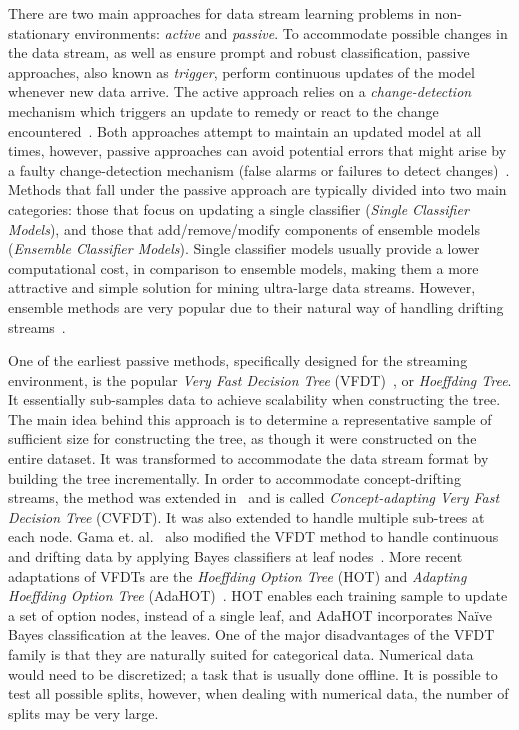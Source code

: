 \documentclass[reqno]{vcuthesis}
\numberwithin{equation}{chapter}
\begin{document}
There are two main approaches for data stream learning problems in non-stationary environments: \textit{active} and \textit{passive}. To accommodate possible changes in the data stream, as well as ensure prompt and robust classification, passive approaches, also known as \textit{trigger}, perform continuous updates of the model whenever new data arrive. The active approach relies on a \textit{change-detection} mechanism which triggers an update to remedy or react to the change encountered~\cite{krawczyk2015one}. Both approaches attempt to maintain an updated model at all times, however, passive approaches can avoid potential errors that might arise by a faulty change-detection mechanism (false alarms or failures to detect changes)~\cite{ditzler2015learning}. Methods that fall under the passive approach are typically divided into two main categories: those that focus on updating a single classifier (\textit{Single Classifier Models}), and those that add/remove/modify components of ensemble models (\textit{Ensemble Classifier Models}). Single classifier models usually provide a lower computational cost, in comparison to ensemble models, making them a more attractive and simple solution for mining ultra-large data streams. However, ensemble methods are very popular due to their natural way of handling drifting streams~\cite{krawczyk2017ensemble}. 

One of the earliest passive methods, specifically designed for the streaming environment, is the popular \textit{Very Fast Decision Tree} (VFDT)~\cite{domingos2000mining}, or \textit{Hoeffding Tree}. It essentially sub-samples data to achieve scalability when constructing the tree. The main idea behind this approach is to determine a representative sample of sufficient size for constructing the tree, as though it were constructed on the entire dataset. It was transformed to accommodate the data stream format by building the tree incrementally. In order to accommodate concept-drifting streams, the method was extended in~\cite{hulten2001mining} and is called \textit{Concept-adapting Very Fast Decision Tree} (CVFDT). It was also extended to handle multiple sub-trees at each node. Gama et. al.~\cite{gama2006decision} also modified the VFDT method to handle continuous and drifting data by applying Bayes classifiers at leaf nodes~\cite{aggarwal}. More recent adaptations of VFDTs are the \textit{Hoeffding Option Tree} (HOT) and \textit{Adapting Hoeffding Option Tree} (AdaHOT)~\cite{pfahringer2007new}. HOT enables each training sample to update a set of option nodes, instead of a single leaf, and AdaHOT incorporates Na\"{i}ve Bayes classification at the leaves. One of the major disadvantages of the VFDT family is that they are naturally suited for categorical data. Numerical data would need to be discretized; a task that is usually done offline. It is possible to test all possible splits, however, when dealing with numerical data, the number of splits may be very large. 
\end{document}
